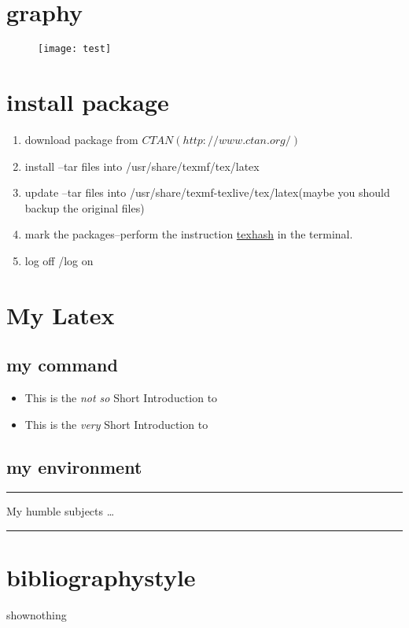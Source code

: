 \documentclass[10pt,a4paper]{article}
\begin{document}
\section{graphy}
\begin{figure}[h]
\begin{center}
\texttt{[image: test]}
\end{center}
\end{figure}


\section{install package}
\begin{enumerate}
\item	download package from $CTAN(http://www.ctan.org/)$
\item	install	--tar files into /usr/share/texmf/tex/latex
\item   update	--tar files into /usr/share/texmf-texlive/tex/latex(maybe you should backup the original files)
\item	mark the packages--perform the instruction \underline{texhash} in the terminal.
\item	log off /log on
\end{enumerate}


\section{My Latex}
\subsection{my command}
\newcommand{\txsit}[1]
{This is the \emph{#1} Short
Introduction to \LaTeXe}
\begin{itemize}
\item \txsit{not so}
\item \txsit{very}
\end{itemize}


\subsection{my environment}
\newenvironment{king}
{\rule{1ex}{1ex}%
\hspace{\stretch{1}}}
{%
\rule{1ex}{1ex}}
\begin{king}
My humble subjects \ldots
\end{king}


\section{bibliographystyle}
shownothing
\end{document}
